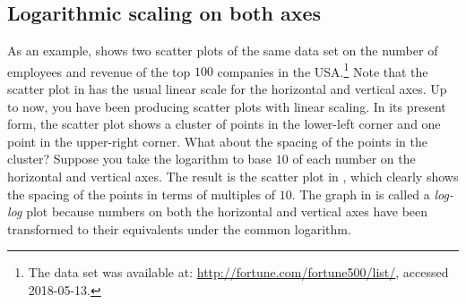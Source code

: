 \documentclass[a4paper,oneside,12pt]{article}
\begin{document}

\subsection{Logarithmic scaling on both axes}

As an example,  shows two scatter
plots of the same data set on the number of employees and revenue of
the top $100$ companies in the USA.\footnote{
  The data set was available at:
  \url{http://fortune.com/fortune500/list/},
  accessed 2018-05-13.
}
Note that the scatter plot in 
has the usual linear scale for the horizontal and vertical axes.  Up
to now, you have been producing scatter plots with linear scaling.  In
its present form, the scatter plot shows a cluster of points in the
lower-left corner and one point in the upper-right corner.  What about
the spacing of the points in the cluster?  Suppose you take the
logarithm to base $10$ of each number on the horizontal and vertical
axes.  The result is the scatter plot in
, which clearly shows the spacing
of the points in terms of multiples of $10$.  The graph in
 is called a \emph{log-log} plot
because numbers on both the horizontal and vertical axes have been
transformed to their equivalents under the common logarithm.
\end{document}
